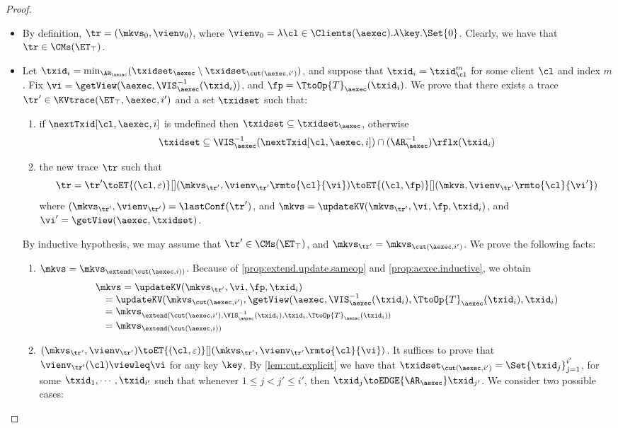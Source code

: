 \begin{proof}
\begin{itemize}
\item {} By definition, $\tr = (\mkvs_{0}, \vienv_{0})$, 
where $\vienv_{0} = \lambda \cl \in \Clients(\aexec). \lambda \key.\Set{0}$. 
Clearly, we have that $\tr \in \CMs(\ET_{\top})$. 
\item {} Let $\txid_{i} = \min_{\AR_{\aexec}}(\txidset_{\aexec} \setminus \txidset_{\cut(\aexec, i')})$, 
and suppose that $\txid_{i} = \txid_{\cl}^{m}$ for some client $\cl$ and index $m$. 
Fix $\vi = \getView(\aexec, \VIS_{\aexec}^{-1}(\txid_{i}))$, and  $\fp = \TtoOp{T}_{\aexec}(\txid_{i})$.
We prove that there exists a trace $\tr' \in \KVtrace(\ET_{\top}, \aexec, i')$ and a set 
$\txidset$ such that: 
\begin{enumerate}
\item if $\nextTxid[\cl, \aexec, i]$ is undefined then $\txidset \subseteq \txidset_{\aexec}$, otherwise 
\[
    \txidset \subseteq \VIS^{-1}_{\aexec}(\nextTxid[\cl, \aexec, i]) \cap (\AR_{\aexec}^{-1})\rflx(\txid_{i})
\]
\item the new trace \( \tr \) such that
\[
    \tr = \tr' \toET{(\cl, \varepsilon)}[] (\mkvs_{\tr'}, \vienv_{\tr'}\rmto{\cl}{\vi}) \toET{(\cl, \fp)}[] 
(\mkvs,  \vienv_{\tr'}\rmto{\cl}{\vi'})
\]
where $(\mkvs_{\tr'}, \vienv_{\tr'}) = \lastConf(\tr')$, and $\mkvs = \updateKV(\mkvs_{\tr'}, \vi, \fp, \txid_{i})$, 
and $\vi' = \getView(\aexec, \txidset)$.
\end{enumerate}
By inductive hypothesis, we may assume that $\tr' \in \CMs(\ET_{\top})$, and $\mkvs_{\tr'} = \mkvs_{\cut(\aexec, i')}$. 
We prove the following facts: 
\begin{enumerate}
\item $\mkvs = \mkvs_{\extend(\cut(\aexec, i))}$. 
Because of \cref{prop:extend.update.sameop} and \cref{prop:aexec.inductive},
we obtain 
\[
\begin{array}{l}
\mkvs = \updateKV(\mkvs_{\tr'}, \vi, \fp, \txid_{i}) \\
\quad = \updateKV(\mkvs_{\cut(\aexec, i')}, \getView(\aexec, \VIS^{-1}_{\aexec}(\txid_{i}), \TtoOp{T}_{\aexec}(\txid_{i}), \txid_{i}) \\
\quad = \mkvs_{\extend(\cut(\aexec, i'), \VIS^{-1}_{\aexec}(\txid_{i}), \txid_{i}, \TtoOp{T}_{\aexec}(\txid_{i})) } \\
\quad = \mkvs_{\extend(\cut(\aexec, i))}
\end{array}
\]

\item $(\mkvs_{\tr'}, \vienv_{\tr'}) \toET{(\cl, \varepsilon)}[] (\mkvs_{\tr'}, \vienv_{\tr'}\rmto{\cl}{\vi})$. 
It suffices to prove that $\vienv_{\tr'}(\cl) \viewleq \vi$ for any key $\key$.
By \cref{lem:cut.explicit} we have that $\txidset_{\cut(\aexec, i')} = \Set{\txid_{j}}_{j=1}^{i'}$, for 
some $\txid_{1},\cdots, \txid_{i'}$ such that whenever $1 \leq j < j' \leq i'$, then 
$\txid_{j} \toEDGE{\AR_{\aexec}} \txid_{j'}$. We consider two possible cases: 


\end{enumerate}
\end{itemize}
\end{proof}
